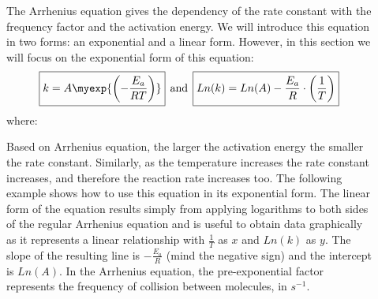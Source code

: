 \documentclass[main.tex]{subfiles}
\newcommand\chapterlabel{kinetics}
\begin{document}
\begin{description}
\item[] 
The Arrhenius equation gives the dependency of the rate constant with the frequency factor and the activation energy. We will introduce this equation in two forms: an exponential and a linear form. However, in this section we will focus on the exponential form of this equation:
\begin{equation}
\boxed{ k=A\myexp{\left(-\frac{E_a}{RT}\right)}} \>\>\text{and} \>\> \boxed{  Ln(k)=Ln(A)  -\frac{E_a}{R} \cdot \left(\frac{1}{T}\right) }
\label{\chapterlabel:equation4}
\end{equation}
where:
Based on Arrhenius equation, the larger the activation energy the smaller the rate constant. Similarly, as the temperature increases the rate constant increases, and therefore the reaction rate increases too. The following example shows how to use this equation in its exponential form.
The linear form of the equation results simply from applying logarithms to both sides of the regular Arrhenius equation and is useful to obtain data graphically as it represents a linear relationship with $\frac{1}{T}$ as $x$ and $Ln(k)$ as $y$. The slope of the resulting line is $-\frac{E_a}{R}$ (mind the negative sign) and the intercept is $Ln(A)$. In the Arrhenius equation, the pre-exponential factor represents the frequency of collision between molecules, in $s^{-1}$. 



\end{description}
\end{document}
